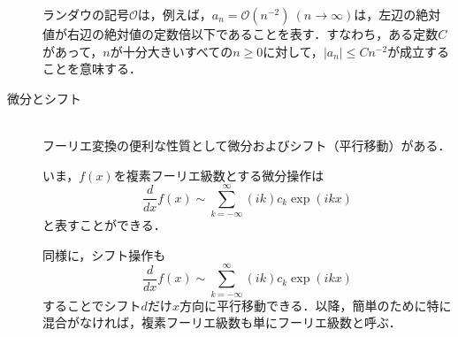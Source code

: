 \documentclass[11pt,a4paper,titlepage]{jsreport}
\theoremstyle{definition}
\begin{document}
\begin{description}
    ランダウの記号$\mathcal{O}$は，例えば，$a_n=\mathcal{O}(n^{-2})\ (n\rightarrow\infty)$は，左辺の絶対値が右辺の絶対値の定数倍以下であることを表す．すなわち，ある定数$C$があって，$n$が十分大きいすべての$n\geq 0$に対して，$|a_n|\leq Cn^{-2}$が成立することを意味する．

  \item[微分とシフト]
    \quad\\
    フーリエ変換の便利な性質として微分およびシフト（平行移動）がある．

    いま，$f(x)$を複素フーリエ級数とする微分操作は
    \begin{equation*}
      \frac{d}{dx}f(x) \sim \sum_{k=-\infty}^{\infty} (ik)c_k \exp(ikx)
    \end{equation*}
    と表すことができる．

    同様に，シフト操作も
    \begin{equation*}
      \frac{d}{dx}f(x) \sim \sum_{k=-\infty}^{\infty} (ik)c_k \exp(ikx)
    \end{equation*}
    することでシフト$d$だけ$x$方向に平行移動できる．以降，簡単のために特に混合がなければ，複素フーリエ級数も単にフーリエ級数と呼ぶ．
\end{description}
\end{document}
